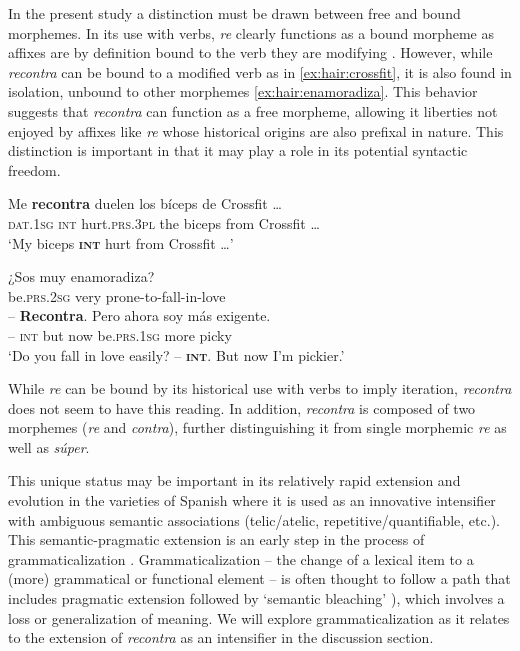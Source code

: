 \documentclass[output=paper,colorlinks,citecolor=brown,
]{langscibook}
\begin{document}
In the present study a distinction must be drawn between free and bound morphemes. In its use with verbs, \textit{re} clearly functions as a bound morpheme as affixes are by definition bound to the verb they are modifying \citep{EscobarHualde}. However, while \textit{recontra} can be bound to a modified verb as in \ref{ex:hair:crossfit}, it is also found in isolation, unbound to other morphemes \ref{ex:hair:enamoradiza}. This behavior suggests that \textit{recontra} can function as a free morpheme, allowing it liberties not enjoyed by affixes like \textit{re} whose historical origins are also prefixal in nature. This distinction is important in that it may play a role in its potential syntactic freedom. 

\begin{exe}
\ex\label{ex:hair:crossfit}
\gll Me \textbf{recontra} duelen los bíceps de Crossfit \ldots \\
\textsc{dat.1sg} \textsc{int} hurt.\textsc{prs.3pl} the biceps from Crossfit \ldots \\
\glt `My biceps \textbf{\textsc{int}} hurt from Crossfit \ldots' \citep{Twitter:Whatareyoudoing2018}\\
\end{exe}

\begin{exe}
\ex\label{ex:hair:enamoradiza}
\gll ¿Sos muy enamoradiza? \\
be.\textsc{prs.2sg} very prone-to-fall-in-love \\
\gll -- \textbf{Recontra}. Pero ahora soy más exigente. \\
-- \textsc{int}    but now be.\textsc{prs.1sg} more picky \\
\glt `Do you fall in love easily? -- \textbf{\textsc{int}}. But now I'm pickier.' \citep{Davies2016}\\
\end{exe}

While \textit{re} can be bound by its historical use with verbs to imply iteration, \textit{recontra} does not seem to have this reading. In addition, \textit{recontra} is composed of two morphemes (\textit{re} and \textit{contra}), further distinguishing it from single morphemic \textit{re} as well as \textit{súper}. 

This unique status may be important in its relatively rapid extension and evolution in the varieties of Spanish where it is used as an innovative intensifier with ambiguous semantic associations (telic/atelic, repetitive/quantifiable, etc.). This semantic-pragmatic extension is an early step in the process of grammaticalization \citep{HopperTraugott2003,HeineNarrog2010}. Grammaticalization -- the change of a lexical item to a (more) grammatical or functional element \citep{HopperTraugott2003} -- is often thought to follow a path that includes pragmatic extension followed by 
`semantic bleaching' \citep{TraugottBerndHeine1991,CampbellJanda2001,HeineNarrog2010}), which involves a loss or generalization of meaning. We will explore grammaticalization as it relates to the extension of \textit{recontra} as an intensifier in the discussion section. 
\end{document}

